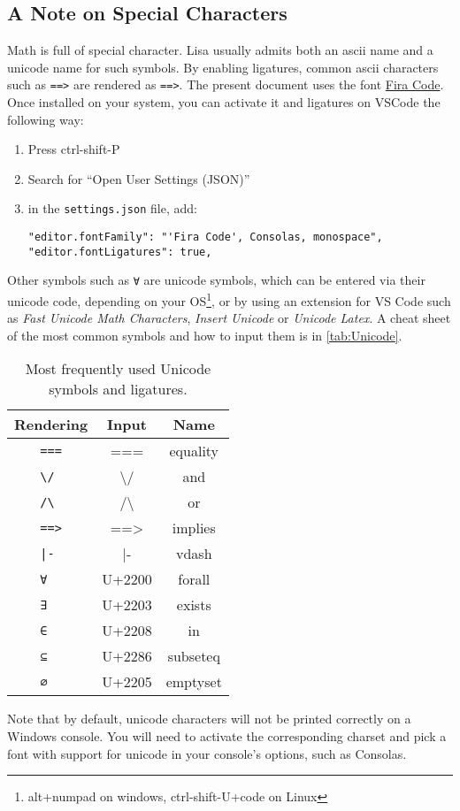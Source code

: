\subsection*{A Note on Special Characters}
Math is full of special character. Lisa usually admits both an ascii name and a unicode name for such symbols. By enabling ligatures, common ascii characters such as \lstinline|=|\lstinline|=|\lstinline|>| are rendered as \lstinline|==>|. 
The present document uses the font \href{https://github.com/tonsky/FiraCode}{Fira Code}. Once installed on your system, you can activate it and ligatures on VSCode the following way:
\begin{enumerate}
  \item Press ctrl-shift-P
  \item Search for ``Open User Settings (JSON)''
  \item in the \lstinline|settings.json| file, add:
  \begin{lstlisting}
"editor.fontFamily": "'Fira Code', Consolas, monospace",
"editor.fontLigatures": true,
  \end{lstlisting}
\end{enumerate}
Other symbols such as \lstinline|∀| are unicode symbols, which can be entered via their unicode code, depending on your OS\footnote{alt+numpad on windows, ctrl-shift-U+code on Linux}, or by using an extension for VS Code such as \emph{Fast Unicode Math Characters}, \emph{Insert Unicode} or \emph{Unicode Latex}.
A cheat sheet of the most common symbols and how to input them is in \autoref{tab:Unicode}.
\begin{table}
  \center
  \begin{tabular}{c|c|c}
    Rendering         & Input            & Name     \\ \hline
    \lstinline| === | & ===              & equality \\ \hline
    \lstinline| \/  | & \textbackslash / & and      \\ \hline
    \lstinline| /\  | & /\textbackslash  & or       \\ \hline
    \lstinline| ==> | & ==>              & implies  \\ \hline
    \lstinline+ |-  + &  |-              & vdash    \\ \hline
    \lstinline| ∀   | & U+2200           & forall   \\ \hline
    \lstinline| ∃   | & U+2203           & exists   \\ \hline
    \lstinline| ∈   | & U+2208           & in       \\ \hline
    \lstinline| ⊆   | & U+2286           & subseteq \\ \hline
    \lstinline| ∅   | & U+2205           & emptyset \\ 
  \end{tabular}
  \caption{Most frequently used Unicode symbols and ligatures.}
  \label{tab:Unicode}
\end{table}
Note that by default, unicode characters will not be printed correctly on a Windows console. You will need to activate the corresponding charset and pick a font with support for unicode in your console's options, such as Consolas.

